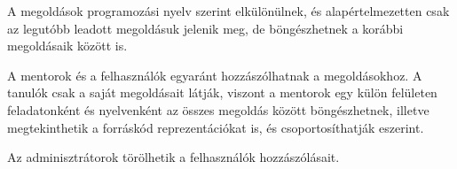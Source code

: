 A megoldások programozási nyelv szerint elkülönülnek, és alapértelmezetten csak az legutóbb leadott megoldásuk jelenik meg, de böngészhetnek a korábbi megoldásaik között is.

A mentorok és a felhasználók egyaránt hozzászólhatnak a megoldásokhoz. A tanulók csak a saját megoldásait látják, viszont a mentorok egy külön felületen feladatonként és nyelvenként az összes megoldás között böngészhetnek, illetve megtekinthetik a forráskód reprezentációkat is, és csoportosíthatják eszerint.

Az adminisztrátorok törölhetik a felhasználók hozzászólásait.











